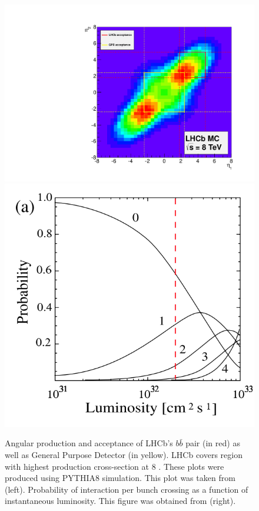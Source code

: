\begin{figure}
	\centering
	\includegraphics[scale = 0.4]{figs/detector/Acceptance.pdf}%
	\includegraphics[scale = 0.5]{figs/detector/ProbInt.png}
	\caption{Angular production and acceptance of LHCb's $b\bar{b}$ pair (in red) as well as General Purpose Detector (in yellow). \Gls{LHCb} covers region with highest production cross-section at 8 \tev. These plots were produced using PYTHIA8 \cite{pythia8} simulation. This plot was taken from \cite{acceptance} (left). Probability of interaction per bunch crossing as a function of instantaneous luminosity. This figure was obtained from \cite{Raven:2007zi} (right).}
	\label{fig:Acceptance}
\end{figure}

